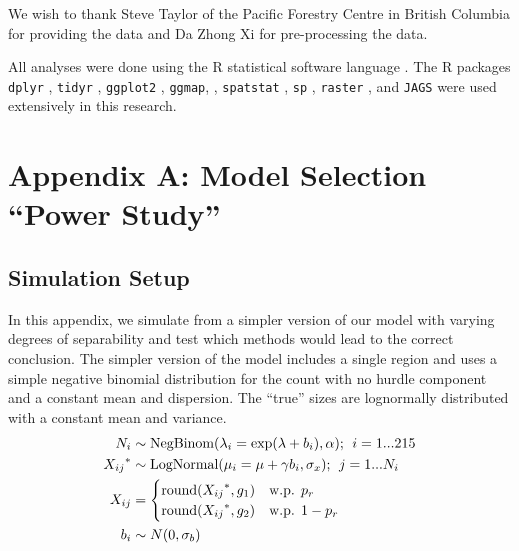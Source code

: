 \documentclass[10pt,letterpaper]{article}
\begin{document}
We wish to thank Steve Taylor of the Pacific Forestry Centre in
British Columbia for providing the data and Da Zhong Xi for
pre-processing the data.

All analyses were done using the R statistical software language
\cite{rcoreteamLanguageEnvironmentStatistical2019}. The R packages
\texttt{dplyr} \cite{Wickham}, \texttt{tidyr} \cite{Wickham2018},
\texttt{ggplot2} \cite{Wickham2016}, \texttt{ggmap}, \cite{Kahle2013},
\texttt{spatstat} \cite{baddeleySpatstatPackageAnalyzing2005},
\texttt{sp} \cite{pebesmaClassesMethodsSpatial2005}, \texttt{raster}
\cite{hijmansRasterGeographicData2019}, and \texttt{JAGS}
\cite{plummerJAGSProgramAnalysis2003} were used extensively in this
research.

\hypertarget{appendix-b-model-selection-power-study}{%
\section{Appendix A: Model Selection ``Power
Study''}\label{appendix-b-model-selection-power-study}}


\hypertarget{simulation-setup}{%
\subsection{Simulation Setup}\label{simulation-setup}}

In this appendix, we simulate from a simpler version of our model with
varying degrees of separability and test which methods would lead to the
correct conclusion. The simpler version of the model includes a single
region and uses a simple negative binomial distribution for the count
with no hurdle component and a constant mean and dispersion. The
``true'' sizes are lognormally distributed with a constant mean and
variance. \begin{align*}
N_i &\sim \text{NegBinom}(\lambda_i = \exp(\lambda + b_i), \alpha)\text{;\; }i=1...215\\
{X_{ij}}^* &\sim \text{LogNormal}(\mu_i = \mu + \gamma b_i, \sigma_x)\text{;\; }j = 1...N_i\\
X_{ij} &= \begin{cases}
\text{round}({X_{ij}}^*, g_1) & \text{w.p. }p_r\\
\text{round}({X_{ij}}^*, g_2) & \text{w.p. }1-p_r
\end{cases}\\
b_i &\sim N(0, \sigma_b)
\end{align*}
\end{document}
